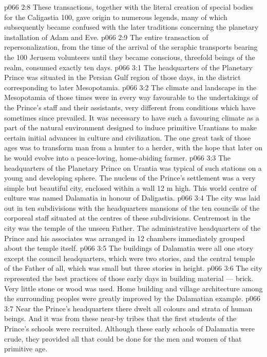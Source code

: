 \vs p066 2:8 \pc These transactions, together with the literal creation of special bodies for the Caligastia 100, gave origin to numerous legends, many of which subsequently became confused with the later traditions concerning the planetary installation of Adam and Eve.
\vs p066 2:9 The entire transaction of repersonalization, from the time of the arrival of the seraphic transports bearing the 100 Jerusem volunteers until they became conscious, threefold beings of the realm, consumed exactly ten days.
\vs p066 3:1 The headquarters of the Planetary Prince was situated in the Persian Gulf region of those days, in the district corresponding to later Mesopotamia.
\vs p066 3:2 The climate and landscape in the Mesopotamia of those times were in every way favourable to the undertakings of the Prince’s staff and their assistants, very different from conditions which have sometimes since prevailed. It was necessary to have such a favouring climate as a part of the natural environment designed to induce primitive Urantians to make certain initial advances in culture and civilization. The one great task of those ages was to transform man from a hunter to a herder, with the hope that later on he would evolve into a peace\hyp{}loving, home\hyp{}abiding farmer.
\vs p066 3:3 \pc The headquarters of the Planetary Prince on Urantia was typical of such stations on a young and developing sphere. The nucleus of the Prince’s settlement was a very simple but beautiful city, enclosed within a wall 12 m high. This world centre of culture was named Dalamatia in honour of Daligastia.
\vs p066 3:4 The city was laid out in ten subdivisions with the headquarters mansions of the ten councils of the corporeal staff situated at the centres of these subdivisions. Centremost in the city was the temple of the unseen Father. The administrative headquarters of the Prince and his associates was arranged in 12 chambers immediately grouped about the temple itself.
\vs p066 3:5 The buildings of Dalamatia were all one story except the council headquarters, which were two stories, and the central temple of the Father of all, which was small but three stories in height.
\vs p066 3:6 The city represented the best practices of those early days in building material --- brick. Very little stone or wood was used. Home building and village architecture among the surrounding peoples were greatly improved by the Dalamatian example.
\vs p066 3:7 \pc Near the Prince’s headquarters there dwelt all colours and strata of human beings. And it was from these near\hyp{}by tribes that the first students of the Prince’s schools were recruited. Although these early schools of Dalamatia were crude, they provided all that could be done for the men and women of that primitive age.
